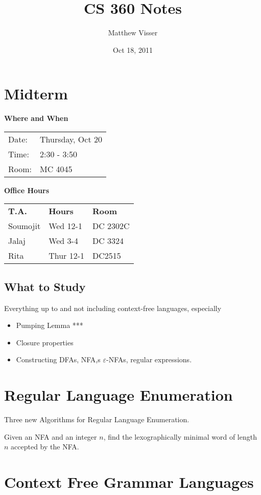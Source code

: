 \documentclass[12pt]{article}
\begin{document}
\title{CS 360 Notes}
\author{Matthew Visser}
\date{Oct 18, 2011}
\maketitle

\section{Midterm}

\textbf{Where and When}

\begin{tabular}{lp{5cm}}
	Date: & Thursday, Oct 20\\
	Time: & 2:30 - 3:50\\
	Room: & MC 4045
\end{tabular}

\textbf{Office Hours}

\begin{tabular}{lll}
	\textbf{T.A.} & \textbf{Hours} & \textbf{Room} \\
	Soumojit & Wed 12-1 & DC 2302C\\
	Jalaj & Wed 3-4 & DC 3324\\
	Rita & Thur 12-1 & DC2515\\
\end{tabular}

\subsection{What to Study}

Everything up to and not including context-free languages, especially
\begin{itemize}
	\item Pumping Lemma ***
	\item Closure  properties
	\item Constructing DFAs, NFA,s $\varepsilon$-NFAs, regular expressions.
\end{itemize}

\section{Regular Language Enumeration}

Three new Algorithms for Regular Language Enumeration.

Given an NFA and an integer $n$, find the lexographically minimal word of length
$n$ accepted by the NFA.

\section{Context Free Grammar Languages}
\end{document}
